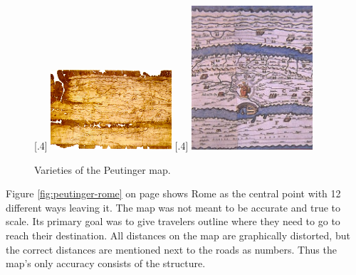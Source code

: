 \begin{figure}[!htb]
    \centering
	[.4\linewidth]
    {
        \includegraphics[width=0.4\textwidth,keepaspectratio]
        {images/history/peutinger.png}
    }
    \qquad
    [.4\linewidth]
    {
        \includegraphics[width=0.4\textwidth,keepaspectratio]
        {images/history/peutinger_rom.jpg}
    }

    \caption{Varieties of the Peutinger map.}
\end{figure}


Figure \ref{fig:peutinger-rome} on page \pageref{fig:peutinger-rome} shows Rome as the central point with 12 different ways leaving it. The map was not meant to be accurate and true to scale. Its primary goal was to give travelers outline where they need to go to reach their destination. All distances on the map are graphically distorted, but the correct distances are mentioned next to the roads as numbers. Thus the map's only accuracy consists of the structure.

